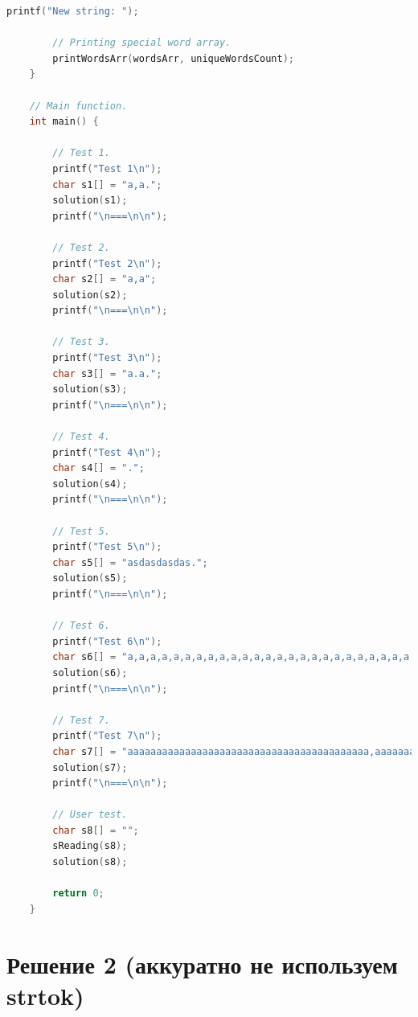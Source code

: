 \documentclass[12pt]{article}
\begin{document}
\begin{lstlisting}[language=C]
		printf("New string: ");
		
		// Printing special word array.
		printWordsArr(wordsArr, uniqueWordsCount);
	}
	
	// Main function.
	int main() {
		
		// Test 1.
		printf("Test 1\n");
		char s1[] = "a,a.";
		solution(s1);
		printf("\n===\n\n");
		
		// Test 2.
		printf("Test 2\n");
		char s2[] = "a,a";
		solution(s2);
		printf("\n===\n\n");
		
		// Test 3.
		printf("Test 3\n");
		char s3[] = "a.a.";
		solution(s3);
		printf("\n===\n\n");
		
		// Test 4.
		printf("Test 4\n");
		char s4[] = ".";
		solution(s4);
		printf("\n===\n\n");
		
		// Test 5.
		printf("Test 5\n");
		char s5[] = "asdasdasdas.";
		solution(s5);
		printf("\n===\n\n");
		
		// Test 6.
		printf("Test 6\n");
		char s6[] = "a,a,a,a,a,a,a,a,a,a,a,a,a,a,a,a,a,a,a,a,a,a,a,a,a,a,a,a,a,a,a,a,a,a,a,a,a,a,a,a,a,a,a,a,a,a,a,a,a,a,a,a,a,a,a,a,a,a,a,a,a.";
		solution(s6);
		printf("\n===\n\n");
		
		// Test 7.
		printf("Test 7\n");
		char s7[] = "aaaaaaaaaaaaaaaaaaaaaaaaaaaaaaaaaaaaaaaaaa,aaaaaaaaaaaaaaaaaaaaaaaaaaaaaaaaaaaaaaaaaa,aaaaaaaaaaaaaaaaaaaaaaaaaaaaaaaaaaaaaaaaaaa,aaaaaaaaaaaaaaaaaaaaaaaaaaaaaaaaaaaaaaaa,aaaaaaaaaaaaaaaaaaaaaaaaaaaaaaaaaaaaaaaaaaaaa,aaaaaaaaaaaaaaaaaaaaaaaaaaaaaaaaaaaaaaa,aaaaaaaaaaaaaaaaaaaaaaaaaaaaaaaaaaaaaaaaaaaaaaaaa.";
		solution(s7);
		printf("\n===\n\n");
		
		// User test.
		char s8[] = "";
		sReading(s8);
		solution(s8);
		
		return 0;
	}
	\end{lstlisting}
	
	\newpage
	
	\section*{Решение 2 (аккуратно не используем strtok)}
	
\end{document}

